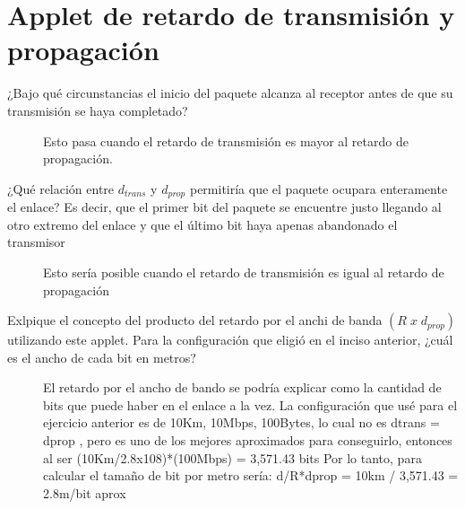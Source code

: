 
\section*{Applet de retardo de transmisi\'on y propagaci\'on}

	\begin{description}
		\item[¿Bajo qué circunstancias el inicio del paquete alcanza al receptor antes de que su transmisi\'on se haya completado?] 
		Esto pasa cuando el retardo de transmisión es mayor al retardo de propagación.
		
		\item[¿Qu\'e relaci\'on entre $d_{trans}$ y $d_{prop}$ permitir\'ia que el paquete ocupara enteramente el enlace? Es decir, que el primer bit del paquete se encuentre justo llegando al otro extremo del enlace y que el \'ultimo bit haya apenas abandonado el transmisor]
		Esto sería posible cuando el retardo de transmisión es igual al retardo de propagación
		
		\item[Exlpique el concepto del producto del retardo por el anchi de banda $(R\;x\;d_{prop})$ utilizando este applet. Para la configuraci\'on que eligi\'o en el inciso anterior, ¿cu\'al es el ancho de cada bit en metros?]
		El retardo por el ancho de bando se podría explicar como la cantidad de bits que puede haber en el enlace a la vez. La configuración que usé para el ejercicio anterior es de 10Km, 10Mbps, 100Bytes, lo cual no es dtrans = dprop , pero es uno de los mejores aproximados para conseguirlo, entonces al ser (10Km/2.8x108)*(100Mbps) = 3,571.43 bits
		Por lo tanto, para calcular el tamaño de bit por metro sería: 
		d/R*dprop = 10km / 3,571.43 = 2.8m/bit aprox
		
	\end{description}